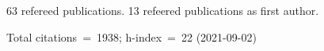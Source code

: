 63 refereed publications. 13 refeered publications as first author.

Total citations~=~1938; h-index~=~22 (2021-09-02)